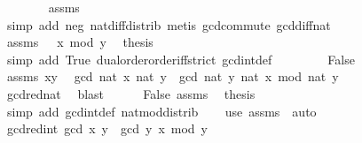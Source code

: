 \begin{isabellebody}
\ \ \ \ \ \ \isamarkupfalse%
\ assms\ \isanewline
\ \ \ \ \ \ \isamarkupfalse%
\ {\isacharparenleft}{\kern0pt}simp\ add{\isacharcolon}{\kern0pt}\ neg\ nat{\isacharunderscore}{\kern0pt}diff{\isacharunderscore}{\kern0pt}distrib{\isacharprime}{\kern0pt}{\isacharparenright}{\kern0pt}\ {\isacharparenleft}{\kern0pt}metis\ gcd{\isachardot}{\kern0pt}commute\ gcd{\isacharunderscore}{\kern0pt}diff{}{\isacharunderscore}{\kern0pt}nat{\isacharparenright}{\kern0pt}\isanewline
\ \ \ \ \isamarkupfalse%
\ assms\ {\isacartoucheopen}{}\ {\isasymle}\ x\ mod\ y{\isacartoucheclose}\ \isamarkupfalse%
\ {\isacharquery}{\kern0pt}thesis\isanewline
\ \ \ \ \ \ \isamarkupfalse%
\ {\isacharparenleft}{\kern0pt}simp\ add{\isacharcolon}{\kern0pt}\ True\ dual{\isacharunderscore}{\kern0pt}order{\isachardot}{\kern0pt}order{\isacharunderscore}{\kern0pt}iff{\isacharunderscore}{\kern0pt}strict\ gcd{\isacharunderscore}{\kern0pt}int{\isacharunderscore}{\kern0pt}def{\isacharparenright}{\kern0pt}\isanewline
\ \ \isamarkupfalse%
\isanewline
\ \ \ \ \isamarkupfalse%
\ False\isanewline
\ \ \ \ \isamarkupfalse%
\ assms\ xy\ \isamarkupfalse%
\ {\isachardoublequoteopen}gcd\ {\isacharparenleft}{\kern0pt}nat\ x{\isacharparenright}{\kern0pt}\ {\isacharparenleft}{\kern0pt}nat\ y{\isacharparenright}{\kern0pt}\ {\isacharequal}{\kern0pt}\ gcd\ {\isacharparenleft}{\kern0pt}nat\ y{\isacharparenright}{\kern0pt}\ {\isacharparenleft}{\kern0pt}nat\ x\ mod\ nat\ y{\isacharparenright}{\kern0pt}{\isachardoublequoteclose}\isanewline
\ \ \ \ \ \ \isamarkupfalse%
\ gcd{\isacharunderscore}{\kern0pt}red{\isacharunderscore}{\kern0pt}nat\ \isamarkupfalse%
\ blast\isanewline
\ \ \ \ \isamarkupfalse%
\ False\ assms\ \isamarkupfalse%
\ {\isacharquery}{\kern0pt}thesis\isanewline
\ \ \ \ \ \ \isamarkupfalse%
\ {\isacharparenleft}{\kern0pt}simp\ add{\isacharcolon}{\kern0pt}\ gcd{\isacharunderscore}{\kern0pt}int{\isacharunderscore}{\kern0pt}def\ nat{\isacharunderscore}{\kern0pt}mod{\isacharunderscore}{\kern0pt}distrib{\isacharparenright}{\kern0pt}\isanewline
\ \ \isamarkupfalse%
\isanewline
{}\isamarkupfalse%
\ {\isacharparenleft}{\kern0pt}use\ assms\ \ auto{\isacharparenright}{\kern0pt}%
\endisatagproof
{\isafoldproof}%
%
\isadelimproof
\isanewline
%
\endisadelimproof
\isanewline
{}\isamarkupfalse%
\ gcd{\isacharunderscore}{\kern0pt}red{\isacharunderscore}{\kern0pt}int{\isacharcolon}{\kern0pt}\ {\isachardoublequoteopen}gcd\ x\ y\ {\isacharequal}{\kern0pt}\ gcd\ y\ {\isacharparenleft}{\kern0pt}x\ mod\ y{\isacharparenright}{\kern0pt}{\isachardoublequoteclose}\isanewline

\end{isabellebody}
